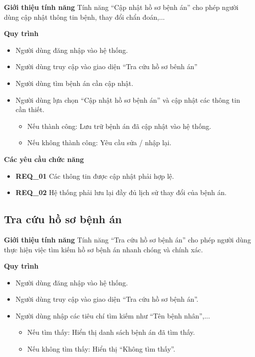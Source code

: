 \noindent \textbf{Giới thiệu tính năng}
Tính năng ``Cập nhật hồ sơ bệnh án'' cho phép người dùng cập nhật thông tin bệnh, thay đổi chẩn đoán,...

\noindent \textbf{Quy trình}
\begin{itemize}
    \item Người dùng đăng nhập vào hệ thống.
    \item Người dùng truy cập vào giao diện ``Tra cứu hồ sơ bênh án''
    \item Người dùng tìm bệnh án cần cập nhật.
    \item Người dùng lựa chọn ``Cập nhật hồ sơ bệnh án'' và cập nhật các thông tin cần thiết.
    \begin{itemize}
        \item Nếu thành công: Lưu trữ bệnh án đã cập nhật vào hệ thống.
        \item Nếu không thành công: Yêu cầu sửa / nhập lại.
    \end{itemize}
\end{itemize}

\noindent \textbf{Các yêu cầu chức năng}
\begin{itemize}
    \item \textbf{REQ\_01} Các thông tin được cập nhật phải hợp lệ.
    \item \textbf{REQ\_02} Hệ thống phải lưu lại đầy đủ lịch sử thay đổi của bệnh án.
\end{itemize}

\subsection{Tra cứu hồ sơ bệnh án}

\noindent \textbf{Giới thiệu tính năng}
Tính năng ``Tra cứu hồ sơ bệnh án'' cho phép người dùng thực hiện việc tìm kiếm hồ sơ bệnh án nhanh chóng và chính xác.

\noindent \textbf{Quy trình}
\begin{itemize}
    \item Người dùng đăng nhập vào hệ thống.
    \item Người dùng truy cập vào giao diện ``Tra cứu hồ sơ bệnh án''.
    \item Người dùng nhập các tiêu chí tìm kiếm như ``Tên bệnh nhân'',...
    \begin{itemize}
        \item Nếu tìm thấy: Hiển thị danh sách bệnh án đã tìm thấy.
        \item Nếu không tìm thấy: Hiển thị ``Không tìm thấy''.
    \end{itemize}
\end{itemize}

